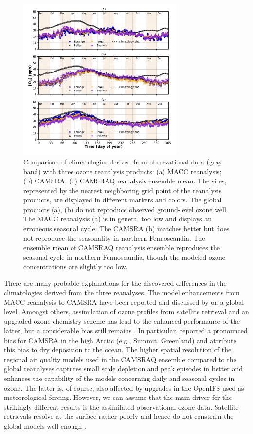 \documentclass[bg, manuscript]{copernicus}
\begin{document}
\begin{figure}[t]
  \includegraphics[width=8.3cm]{fig07}
  \caption{Comparison of climatologies derived from observational data (gray band) with three ozone reanalysis products: (a) MACC reanalysis; (b) CAMSRA; (c) CAMSRAQ reanalysis ensemble mean. The sites, represented by the nearest neighboring grid point of the \chem{[O_3]} reanalysis products, are displayed in different markers and colors. The global products (a), (b) do not reproduce observed ground-level ozone well. The MACC reanalysis (a) is in general too low and displays an erroneous seasonal cycle. The CAMSRA (b) matches better but does not reproduce the seasonality in northern Fennoscandia. The ensemble mean of CAMSRAQ reanalysis ensemble reproduces the seasonal cycle in northern Fennoscandia, though the modeled ozone concentrations are slightly too low.}
  \label{fig:ozone_climatologies}
\end{figure}

There are many probable explanations for the discovered differences in the climatologies derived from the three reanalyses. The model enhancements from MACC reanalysis to CAMSRA have been reported and discussed by \citet{ACP:Inness2019} on a global level. Amongst others, assimilation of ozone profiles from satellite retrieval and an upgraded ozone chemistry scheme has lead to the enhanced performance of the latter, but a considerable bias still remains \citep{GMD:Huijnen2020}. In particular, \citet{ACPD:Barten2020} reported a pronounced bias for CAMSRA in the high Arctic (e.g., Summit, Greenland) and attribute this bias to dry deposition to the ocean. The higher spatial resolution of the regional air quality models used in the CAMSRAQ ensemble compared to the global reanalyses captures small scale depletion and peak episodes in \chem{[O_3]} better and enhances the capability of the models concerning daily and seasonal cycles in ozone. The latter is, of course, also affected by upgrades in the OpenIFS used as meteorological forcing. However, we can assume that the main driver for the strikingly different results is the assimilated observational ozone data. Satellite retrievals resolve \chem{[O_3]} at the surface rather poorly and hence do not constrain the global models well enough \citep{ACP:Andersson2017}. 
\end{document}
